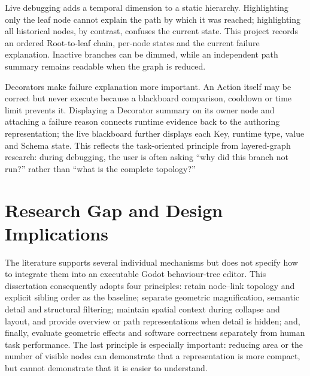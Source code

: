 Live debugging adds a temporal dimension to a static hierarchy. Highlighting only the leaf node cannot explain the path by which it was reached; highlighting all historical nodes, by contrast, confuses the current state. This project records an ordered Root-to-leaf chain, per-node states and the current failure explanation. Inactive branches can be dimmed, while an independent path summary remains readable when the graph is reduced.

Decorators make failure explanation more important. An Action itself may be correct but never execute because a blackboard comparison, cooldown or time limit prevents it. Displaying a Decorator summary on its owner node and attaching a failure reason connects runtime evidence back to the authoring representation; the live blackboard further displays each Key, runtime type, value and Schema state. This reflects the task-oriented principle from layered-graph research: during debugging, the user is often asking ``why did this branch not run?'' rather than ``what is the complete topology?''

\section{Research Gap and Design Implications}

The literature supports several individual mechanisms but does not specify how to integrate them into an executable Godot behaviour-tree editor. This dissertation consequently adopts four principles: retain node--link topology and explicit sibling order as the baseline; separate geometric magnification, semantic detail and structural filtering; maintain spatial context during collapse and layout, and provide overview or path representations when detail is hidden; and, finally, evaluate geometric effects and software correctness separately from human task performance. The last principle is especially important: reducing area or the number of visible nodes can demonstrate that a representation is more compact, but cannot demonstrate that it is easier to understand.

